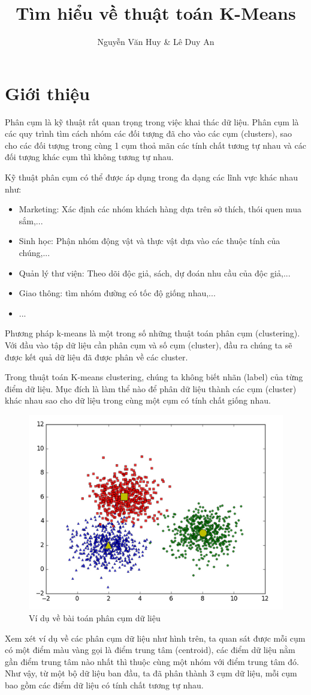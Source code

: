 \documentclass{article}
\title{Tìm hiểu về thuật toán K-Means}
\author{Nguyễn Văn Huy \& Lê Duy An}
\begin{document}
\maketitle{} 
\newpage
\tableofcontents
\newpage

\section{Giới thiệu} %
\label{sec:giới_thiệu}
Phân cụm là kỹ thuật rất quan trọng trong việc khai thác dữ liệu. Phân cụm là các quy trình tìm cách nhóm các đối tượng đã cho vào các cụm (clusters), sao cho các đối tượng trong cùng 1 cụm thoả mãn các tính chất tương tự nhau và các đối tượng khác cụm thì không tương tự nhau.\par
\smallskip
Kỹ thuật phân cụm có thể được áp dụng trong đa dạng các lĩnh vực khác nhau như:
\begin{itemize}
	\item Marketing: Xác định các nhóm khách hàng dựa trên sở thích, thói quen mua sắm,...
	\item Sinh học: Phận nhóm động vật và thực vật dựa vào các thuộc tính của chúng,...
	\item Quản lý thư viện: Theo dõi độc giả, sách, dự đoán nhu cầu của độc giả,...
	\item Giao thông: tìm nhóm đường có tốc độ giống nhau,...
	\item ...
\end{itemize}
Phương pháp k-means là một trong số những thuật toán phân cụm (clustering). Với đầu vào tập dữ liệu cần phân cụm và số cụm (cluster), đầu ra chúng ta sẽ được kết quả dữ liệu đã được phân về các cluster.\par
\smallskip
Trong thuật toán K-means clustering, chúng ta không biết nhãn (label) của từng điểm dữ liệu. Mục đích là làm thể nào để phân dữ liệu thành các cụm (cluster) khác nhau sao cho dữ liệu trong cùng một cụm có tính chất giống nhau.\par
\smallskip
\begin{figure}[h]
	\centering
	\includegraphics[width=0.7\linewidth]{img/cluster_ex}
	\caption{Ví dụ về bài toán phân cụm dữ liệu}
\end{figure}\par
Xem xét ví dụ về các phân cụm dữ liệu như hình trên, ta quan sát được mỗi cụm có một điểm màu vàng gọi là điểm trung tâm (centroid), các điểm dữ liệu nằm gần điểm trung tâm nào nhất thì thuộc cùng một nhóm với điểm trung tâm đó. Như vậy, từ một bộ dữ liệu ban đầu, ta đã phân thành 3 cụm dữ liệu, mỗi cụm bao gồm các điểm dữ liệu có tính chất tương tự nhau.
\newpage
\end{document}
